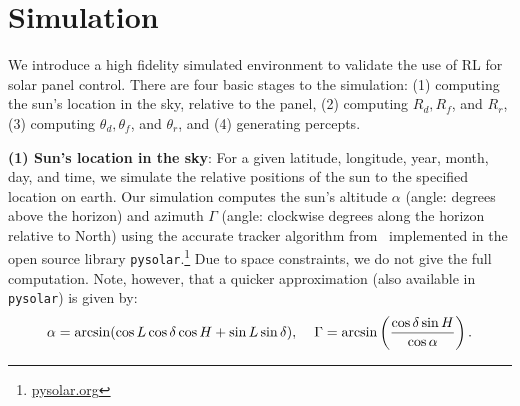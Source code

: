\documentclass{article}
\begin{document}
%

\section{Simulation}
\label{sec:simulation}

We introduce a high fidelity simulated environment to validate the use of RL for solar panel control. There are four basic stages to the simulation: (1) computing the sun's location in the sky, relative to the panel, (2) computing $R_d, R_f$, and $R_r$, (3) computing $\theta_d, \theta_f$, and $\theta_r$, and (4) generating percepts.

{\bf (1) Sun's location in the sky}: For a given latitude, longitude, year, month, day, and time, we simulate the relative positions of the sun to the specified location on earth. Our simulation computes the sun's altitude $\alpha$ (angle: degrees above the horizon) and azimuth $\Gamma$ (angle: clockwise degrees along the horizon relative to North) using the accurate tracker algorithm from~\citet{reda2004solar} implemented in the open source library \texttt{pysolar}.\footnote{\url{pysolar.org}} Due to space constraints, we do not give the full computation. Note, however, that a quicker approximation (also available in \texttt{pysolar}) is given by:
\begin{align}
\alpha = \arcsin(\cos L \cos \delta \cos H + \sin L \sin \delta), \hspace{4mm} \Gamma = \arcsin\left(\frac{\cos \delta \sin H}{\cos \alpha}\right).
\end{align}
\end{document}
